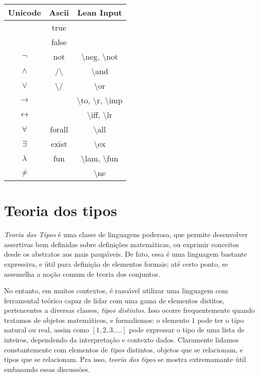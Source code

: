 \begin{table}[ht]
\centering
\begin{tabular}{|c|c|c|}
\hline
Unicode & Ascii & Lean Input\\
\hline
& true &\\
\hline
& false &\\
\hline       
$\neg$ & not & \textbackslash neg, \textbackslash not\\
\hline
$\wedge$ & /\textbackslash & \textbackslash and\\
\hline
$\vee$ & \textbackslash/ & \textbackslash or\\
\hline
$\rightarrow$ &  & \textbackslash to, \textbackslash r, \textbackslash imp\\
\hline
$\leftrightarrow$ &  & \textbackslash iff, \textbackslash lr\\
\hline
$\forall$ & forall & \textbackslash all\\
\hline
$\exists$ & exist & \textbackslash ex\\
\hline
$\lambda$ & fun & \textbackslash lam, \textbackslash fun\\
\hline
$\ne$ &  & \textbackslash ne\\
\hline
\end{tabular}

\end{table}

\section{Teoria dos tipos}
\textit{Teoria dos Tipos} é uma classe de linguagens poderosa, que permite desenvolver assertivas bem definidas sobre definições matemáticas, ou exprimir conceitos desde os abstratos aos mais paupáveis.
De fato, essa é uma linguagem bastante expressiva, e útil para definição de elementos formais; até certo ponto, se assemelha a noção comum de teoria dos conjuntos.

No entanto, em muitos contextos, é razoável utilizar uma linguagem com ferramental teórico capaz de lidar com uma gama de elementos distitos, pertencentes a diversas classes, \textit{tipos distintos}.
Isso ocorre frequentemente quando tratamos de objetos matemáticos, e formalismos: o elemento $1$ pode ter o tipo natural ou real, assim como $[1,2,3, ...]$ pode expressar o tipo de uma lista de inteiros, dependendo da interpretação e contexto dados.
Claramente lidamos constantemente com elementos de \textit{tipos} distintos, objetos que se relacionam, e tipos que se relacionam.
Pra isso, \textit{teoria dos tipos} se mostra extremamante útil embasando essas discussões.

